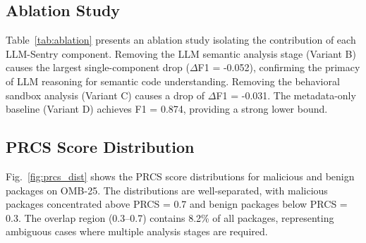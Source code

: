\documentclass[conference]{IEEEtran}
\begin{document}
\subsection{Ablation Study}

Table~\ref{tab:ablation} presents an ablation study isolating the contribution of each LLM-Sentry component. Removing the LLM semantic analysis stage (Variant B) causes the largest single-component drop ($\Delta$F1 = -0.052), confirming the primacy of LLM reasoning for semantic code understanding. Removing the behavioral sandbox analysis (Variant C) causes a drop of $\Delta$F1 = -0.031. The metadata-only baseline (Variant D) achieves F1 = 0.874, providing a strong lower bound.

\begin{table}[htbp]
\caption{Ablation Study on OMB-25 Test Set}
\label{tab:ablation}
\centering
\small
{}
\end{table}

\subsection{PRCS Score Distribution}

Fig.~\ref{fig:prcs_dist} shows the PRCS score distributions for malicious and benign packages on OMB-25. The distributions are well-separated, with malicious packages concentrated above PRCS = 0.7 and benign packages below PRCS = 0.3. The overlap region (0.3--0.7) contains 8.2\% of all packages, representing ambiguous cases where multiple analysis stages are required.
\end{document}
